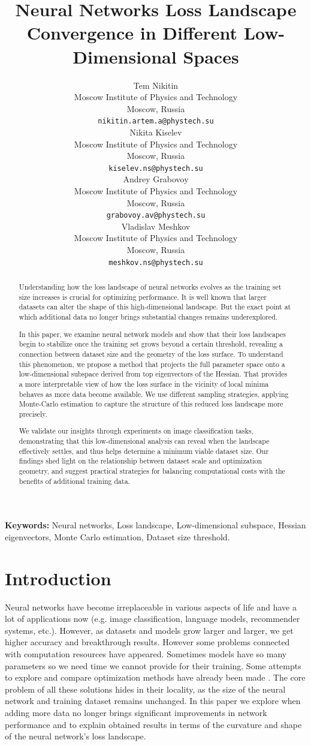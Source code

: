 \documentclass{article}
\title{Neural Networks Loss Landscape Convergence in Different Low-Dimensional Spaces}
\author{
  Tem Nikitin\\
  Moscow Institute of Physics and Technology\\
  Moscow, Russia\\
  \texttt{nikitin.artem.a@phystech.su}\\
  \And
  Nikita Kiselev\\
  Moscow Institute of Physics and Technology\\
  Moscow, Russia\\
  \texttt{kiselev.ns@phystech.su}\\
  \And
  Andrey Grabovoy\\
  Moscow Institute of Physics and Technology\\
  Moscow, Russia\\
  \texttt{grabovoy.av@phystech.su}\\
  \And
  Vladislav Meshkov\\
  Moscow Institute of Physics and Technology\\
  Moscow, Russia\\
  \texttt{meshkov.ns@phystech.su}\\
}
\begin{document}
\maketitle

\begin{abstract}
  Understanding how the loss landscape of neural networks evolves as the training set size increases is crucial for
  optimizing performance. It is well known that larger datasets can alter the shape of this high-dimensional landscape.
  But the exact point at which additional data no longer brings substantial changes remains underexplored.

  In this paper, we examine neural network models and show that their loss landscapes begin to stabilize once the
  training set grows beyond a certain threshold, revealing a connection between dataset size and the geometry of the
  loss surface. To understand this phenomenon, we propose a method that projects the full parameter space onto a
  low-dimensional subspace derived from top eigenvectors of the Hessian. That provides a more interpretable view of how
  the loss surface in the vicinity of local minima behaves as more data become available. We use different sampling
  strategies, applying Monte-Carlo estimation to capture the structure of this reduced loss landscape more precisely.

  We validate our insights through experiments on image classification tasks, demonstrating that this low-dimensional
  analysis can reveal when the landscape effectively settles, and thus helps determine a minimum viable dataset size.
  Our findings shed light on the relationship between dataset scale and optimization geometry, and suggest
  practical strategies for balancing computational costs with the benefits of additional training data.
\end{abstract}

\textbf{Keywords:}
Neural networks, Loss landscape, Low-dimensional subspace, Hessian eigenvectors, Monte Carlo estimation, Dataset size threshold.

\section{Introduction}\label{sec:intro}

Neural networks have become irreplaceable in various aspects of life and have a lot of applications now
(e.g. image classification, language models, recommender systems, etc.). However, as datasets and models grow larger and
larger, we get higher accuracy and breakthrough results. However some problems connected with computation resources have
appeared. Sometimes models have so many parameters so we need time we cannot provide for their training. Some attempts to
explore and compare optimization methods have already been made \cite{soydaner2020comparison}. The core problem of all these
solutions hides in their locality, as the size of the neural network and training dataset remains unchanged. In this paper we
explore when adding more data no longer brings significant improvements in network performance and to explain
obtained results in terms of the curvature and shape of the neural network’s loss landscape.
\end{document}
